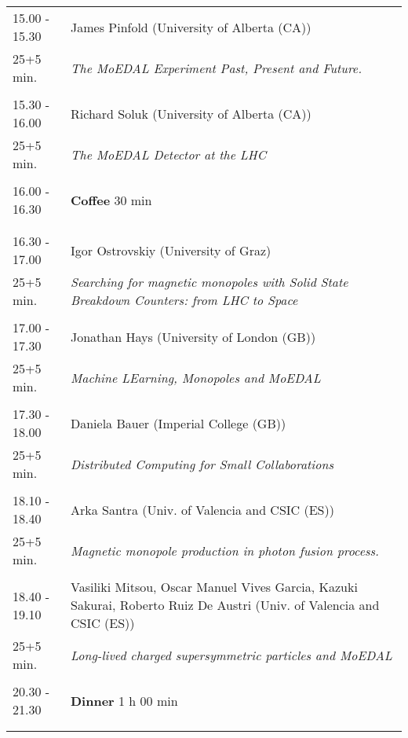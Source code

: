 \begin{longtable}{p{3cm}p{13cm}}
15.00 - 15.30 & James Pinfold (University of Alberta (CA))\\ 
25+5 min. & {\it The MoEDAL Experiment Past, Present and Future.}\\ 
 & \\ 
15.30 - 16.00 & Richard Soluk (University of Alberta (CA))\\ 
25+5 min. & {\it The MoEDAL Detector at the LHC}\\ 
 & \\ 
16.00 - 16.30 & {\bf Coffee} \hfill 30 min \\ 
 & \\ 
 & \\ 
16.30 - 17.00 & Igor Ostrovskiy (University of Graz)\\ 
25+5 min. & {\it Searching for magnetic monopoles with Solid State Breakdown Counters: from LHC to Space}\\ 
 & \\ 
17.00 - 17.30 & Jonathan Hays (University of London (GB))\\ 
25+5 min. & {\it Machine LEarning, Monopoles and MoEDAL}\\ 
 & \\ 
17.30 - 18.00 & Daniela Bauer (Imperial College (GB))\\ 
25+5 min. & {\it Distributed Computing for Small Collaborations}\\ 
 & \\ 
18.10 - 18.40 & Arka Santra (Univ. of Valencia and CSIC (ES))\\ 
25+5 min. & {\it Magnetic monopole production in photon fusion process.}\\ 
 & \\ 
18.40 - 19.10 & Vasiliki Mitsou, Oscar Manuel Vives Garcia, Kazuki Sakurai, Roberto Ruiz De Austri (Univ. of Valencia and CSIC (ES))\\ 
25+5 min. & {\it Long-lived charged supersymmetric particles and MoEDAL}\\ 
 & \\ 
20.30 - 21.30 & {\bf Dinner} \hfill 1 h 00 min \\ 
 & \\ 
 & \\ 
\end{longtable}

